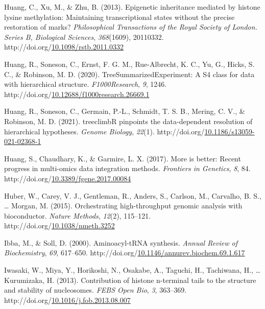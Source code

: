 \documentclass[12pt,twoside]{reedthesis}
\newlength{\cslhangindent}
\newenvironment{CSLReferences}[2] %
 {%
  \setlength{\parindent}{0pt}
  \ifodd #1 \everypar{\setlength{\hangindent}{\cslhangindent}}\ignorespaces\fi
  \ifnum #2 > 0
  \setlength{\parskip}{#2\baselineskip}
  \fi
 }%
 {}
\begin{document}
\begin{CSLReferences}{1}{0}
\leavevmode{}%
Huang, C., Xu, M., \& Zhu, B. (2013). Epigenetic inheritance mediated by histone lysine methylation: Maintaining transcriptional states without the precise restoration of marks? \emph{Philosophical Transactions of the Royal Society of London. Series B, Biological Sciences}, \emph{368}(1609), 20110332. http://doi.org/\href{https://doi.org/10.1098/rstb.2011.0332}{10.1098/rstb.2011.0332}

\leavevmode{}%
Huang, R., Soneson, C., Ernst, F. G. M., Rue-Albrecht, K. C., Yu, G., Hicks, S. C., \& Robinson, M. D. (2020). TreeSummarizedExperiment: A S4 class for data with hierarchical structure. \emph{F1000Research}, \emph{9}, 1246. http://doi.org/\href{https://doi.org/10.12688/f1000research.26669.1}{10.12688/f1000research.26669.1}

\leavevmode{}%
Huang, R., Soneson, C., Germain, P.-L., Schmidt, T. S. B., Mering, C. V., \& Robinson, M. D. (2021). treeclimbR pinpoints the data-dependent resolution of hierarchical hypotheses. \emph{Genome Biology}, \emph{22}(1). http://doi.org/\href{https://doi.org/10.1186/s13059-021-02368-1}{10.1186/s13059-021-02368-1}

\leavevmode{}%
Huang, S., Chaudhary, K., \& Garmire, L. X. (2017). More is better: Recent progress in multi-omics data integration methods. \emph{Frontiers in Genetics}, \emph{8}, 84. http://doi.org/\href{https://doi.org/10.3389/fgene.2017.00084}{10.3389/fgene.2017.00084}

\leavevmode{}%
Huber, W., Carey, V. J., Gentleman, R., Anders, S., Carlson, M., Carvalho, B. S., \ldots{} Morgan, M. (2015). Orchestrating high-throughput genomic analysis with bioconductor. \emph{Nature Methods}, \emph{12}(2), 115--121. http://doi.org/\href{https://doi.org/10.1038/nmeth.3252}{10.1038/nmeth.3252}

\leavevmode{}%
Ibba, M., \& Soll, D. (2000). Aminoacyl-tRNA synthesis. \emph{Annual Review of Biochemistry}, \emph{69}, 617--650. http://doi.org/\href{https://doi.org/10.1146/annurev.biochem.69.1.617}{10.1146/annurev.biochem.69.1.617}

\leavevmode{}%
Iwasaki, W., Miya, Y., Horikoshi, N., Osakabe, A., Taguchi, H., Tachiwana, H., \ldots{} Kurumizaka, H. (2013). Contribution of histone n-terminal tails to the structure and stability of nucleosomes. \emph{FEBS Open Bio}, \emph{3}, 363--369. http://doi.org/\href{https://doi.org/10.1016/j.fob.2013.08.007}{10.1016/j.fob.2013.08.007}


\end{CSLReferences}
\end{document}
